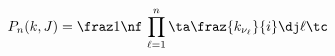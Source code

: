 \begin{equation}
P_n(k,J)=\fraz 1\nf\,\prod\limits_{\ell=1}^{n}
 \ta\fraz{k_{\nu_\ell}}{i}\dj
\ell\tc \label{Pn}
\end{equation}


